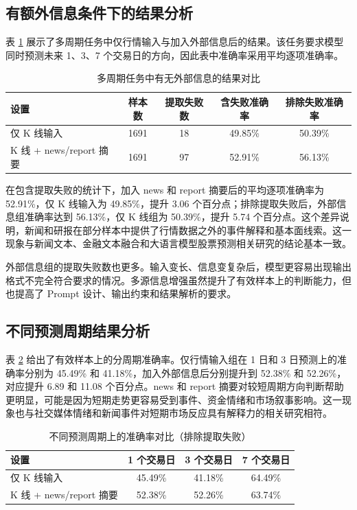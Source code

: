 \subsection{有额外信息条件下的结果分析}

表 \ref{tab:external-compare} 展示了多周期任务中仅行情输入与加入外部信息后的结果。该任务要求模型同时预测未来 1、3、7 个交易日的方向，因此表中准确率采用平均逐项准确率。

\begin{table}[htbp]
  \centering
  \caption{多周期任务中有无外部信息的结果对比}
  \label{tab:external-compare}
  \begin{tabular}{lcccc}
    \toprule
    设置 & 样本数 & 提取失败数 & 含失败准确率 & 排除失败准确率 \\
    \midrule
    仅 K 线输入 & 1691 & 18 & 49.85\% & 50.39\% \\
    K 线 + news/report 摘要 & 1691 & 97 & 52.91\% & 56.13\% \\
    \bottomrule
  \end{tabular}
\end{table}

在包含提取失败的统计下，加入 news 和 report 摘要后的平均逐项准确率为 52.91\%，仅 K 线输入为 49.85\%，提升 3.06 个百分点；排除提取失败后，外部信息组准确率达到 56.13\%，仅 K 线组为 50.39\%，提升 5.74 个百分点。这个差异说明，新闻和研报在部分样本中提供了行情数据之外的事件解释和基本面线索。这一现象与新闻文本、金融文本融合和大语言模型股票预测相关研究的结论基本一致\cite{lopezlira2023chatgptstock,elahi2024financialnewsllm}。

外部信息组的提取失败数也更多。输入变长、信息变复杂后，模型更容易出现输出格式不完全符合要求的情况。多源信息增强虽然提升了有效样本上的判断能力，但也提高了 Prompt 设计、输出约束和结果解析的要求。

\subsection{不同预测周期结果分析}

表 \ref{tab:horizon-compare} 给出了有效样本上的分周期准确率。仅行情输入组在 1 日和 3 日预测上的准确率分别为 45.49\% 和 41.18\%，加入外部信息后分别提升到 52.38\% 和 52.26\%，对应提升 6.89 和 11.08 个百分点。news 和 report 摘要对较短周期方向判断帮助更明显，可能是因为短期走势更容易受到事件、资金情绪和市场叙事影响。这一现象也与社交媒体情绪和新闻事件对短期市场反应具有解释力的相关研究相符\cite{bollen2011twitter,lopezlira2023chatgptstock}。

\begin{table}[htbp]
  \centering
  \caption{不同预测周期上的准确率对比（排除提取失败）}
  \label{tab:horizon-compare}
  \begin{tabular}{lccc}
    \toprule
    设置 & 1 个交易日 & 3 个交易日 & 7 个交易日 \\
    \midrule
    仅 K 线输入 & 45.49\% & 41.18\% & 64.49\% \\
    K 线 + news/report 摘要 & 52.38\% & 52.26\% & 63.74\% \\
    \bottomrule
  \end{tabular}
\end{table}

